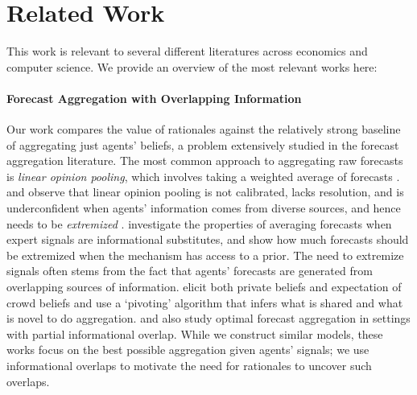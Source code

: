 \documentclass{winnower}
\begin{document}
\section{Related Work}

This work is relevant to several different literatures across economics and computer science. We provide an overview of the most relevant works here:

\paragraph{Forecast Aggregation with Overlapping Information} Our work compares the value of rationales against the relatively strong baseline of aggregating just agents' beliefs, a problem extensively studied in the forecast aggregation literature. The most common approach to aggregating raw forecasts is \emph{linear opinion pooling}, which involves taking a weighted average of forecasts \citep{armstrong2001combining}. \citet{ranjan2010combining} and \citet{satopaa2014combining} observe that linear opinion pooling is not calibrated, lacks resolution, and is underconfident when agents' information comes from diverse sources, and hence needs to be \emph{extremized} \citep{satopaa2015combining}.  \citet{Neyman2021AreYS} investigate the properties of averaging forecasts when expert signals are informational substitutes, and show how much forecasts should be extremized when the mechanism has access to a prior.
The need to extremize signals often stems from the fact that agents' forecasts are generated from overlapping sources of information. \citet{palley2019extracting} elicit both private beliefs and expectation of crowd beliefs and use a `pivoting' algorithm that infers what is shared and what is novel to do aggregation. \citet{satopaa2016modeling,satopaa2017partial} and \citet{babichenko2021learning} also study optimal forecast aggregation in settings with partial informational overlap. While we construct similar models, these works focus on the best possible aggregation given agents' signals; we use informational overlaps to motivate the need for rationales to uncover such overlaps.
\end{document}
